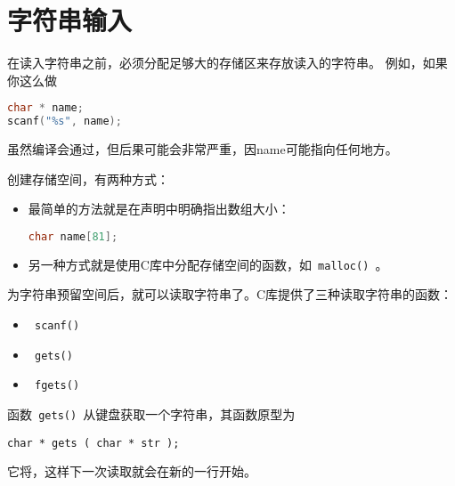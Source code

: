 \section{字符串输入}


\begin{frame}[fragile] 
在读入字符串之前，必须分配足够大的存储区来存放读入的字符串。 例如，如果你这么做
\begin{lstlisting}[language=c,showstringspaces=true]
char * name;
scanf("%s", name);
\end{lstlisting}
虽然编译会通过，但后果可能会非常严重，因{\tf name}可能指向任何地方。
\end{frame}

\begin{frame}[fragile] 
创建存储空间，有两种方式：
\begin{itemize}
\item 
最简单的方法就是在声明中明确指出数组大小：
\begin{lstlisting}[language=c,showstringspaces=true]
char name[81];
\end{lstlisting}
\vspace{0.05in}
\item 
另一种方式就是使用C库中分配存储空间的函数，如\lstinline| malloc() |。
\end{itemize}
\end{frame}

\begin{frame}[fragile] 
为字符串预留空间后，就可以读取字符串了。C库提供了三种读取字符串的函数：
\begin{itemize} 
\item \lstinline| scanf() |
\item \lstinline| gets() |
\item \lstinline| fgets() |
\end{itemize}
\end{frame}

\begin{frame}[fragile] 
函数\lstinline| gets() |从键盘获取一个字符串，其函数原型为
\begin{lstlisting}
char * gets ( char * str );
\end{lstlisting}
\vspace{0.2in}


\vspace{0.2in}
它将，这样下一次读取就会在新的一行开始。
\end{frame}

